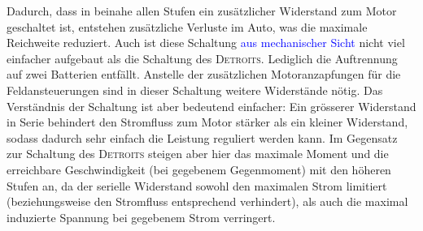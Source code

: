 Dadurch, dass in beinahe allen Stufen ein zusätzlicher Widerstand zum Motor geschaltet ist, entstehen zusätzliche Verluste im Auto, was die maximale Reichweite reduziert. Auch ist diese Schaltung \textcolor{blue}{aus mechanischer Sicht} nicht viel einfacher aufgebaut als die Schaltung des \textsc{Detroits}. Lediglich die Auftrennung auf zwei Batterien entfällt. Anstelle der zusätzlichen Motoranzapfungen für die Feldansteuerungen sind in dieser Schaltung weitere Widerstände nötig. Das Verständnis der Schaltung ist aber bedeutend einfacher: Ein grösserer Widerstand in Serie behindert den Stromfluss zum Motor stärker als ein kleiner Widerstand, sodass dadurch sehr einfach die Leistung reguliert werden kann. Im Gegensatz zur Schaltung des \textsc{Detroits} steigen aber hier das maximale Moment und die erreichbare Geschwindigkeit (bei gegebenem Gegenmoment) mit den höheren Stufen an, da der serielle Widerstand sowohl den maximalen Strom limitiert (beziehungsweise den Stromfluss entsprechend verhindert), als auch die maximal induzierte Spannung bei gegebenem Strom verringert.